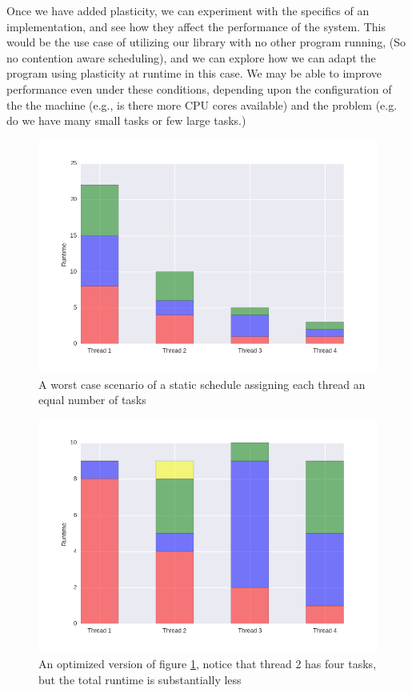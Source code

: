 Once we have added plasticity, we can experiment with the specifics of an implementation, and see how they affect the performance of the system. This would be the use case of utilizing our library with no other program running, (So no contention aware scheduling), and we can explore how we can adapt the program using plasticity at runtime in this case. We may be able to improve performance even under these conditions, depending upon the configuration of the the machine (e.g., is there more CPU cores available) and the problem (e.g. do we have many small tasks or few large tasks.) 



\begin{figure}
	\includegraphics[width=\textwidth]{graphics/unoptimized_schedule.png}
	\caption{A worst case scenario of a static schedule assigning each thread an equal number of tasks}
	\label{fig:unoptimized_schedule}
\end{figure}

\begin{figure}
	\includegraphics[width=\textwidth]{graphics/optimized_schedule.png}
	\caption{An optimized version of figure \ref{fig:unoptimized_schedule}, notice that thread 2 has four tasks, but the total runtime is substantially less}
	\label{fig:optimized_schedule}
\end{figure}



